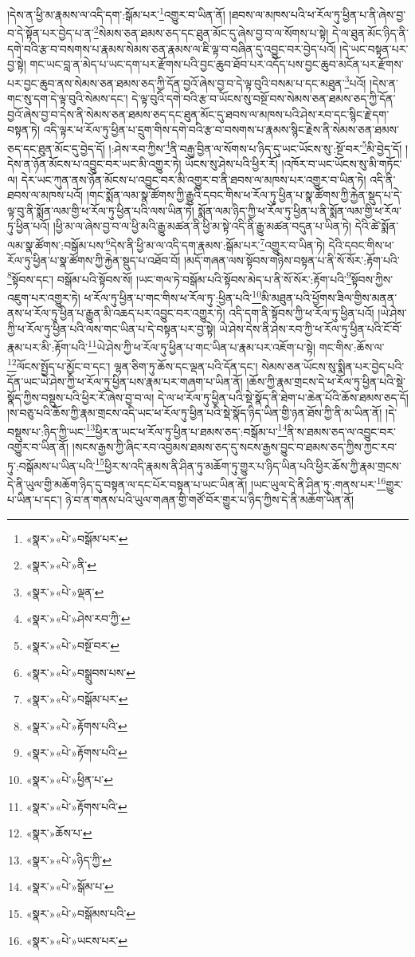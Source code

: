 །དེས་ན་ཕྱི་མ་རྣམས་ལ་འདི་དག་:སྒོམ་པར་\footnote{«སྣར་»«པེ་»བསྒོམ་པར་}འགྱུར་བ་ཡིན་ནོ། །ཐབས་ལ་མཁས་པའི་ཕ་རོལ་ཏུ་ཕྱིན་པ་ནི་ཞེས་བྱ་བ་དེ་སྟོན་པར་བྱེད་པ་ན་\footnote{«སྣར་»«པེ་»ནི་}སེམས་ཅན་ཐམས་ཅད་དང་ཐུན་མོང་དུ་ཞེས་བྱ་བ་ལ་སོགས་པ་སྟེ། དེ་ལ་ཐུན་མོང་ཉིད་ནི་དགེ་བའི་རྩ་བ་བསགས་པ་རྣམས་སེམས་ཅན་རྣམས་ལ་ཇི་ལྟ་བ་བཞིན་དུ་འབྱུང་བར་བྱེད་པའོ། །དེ་ཡང་བསྟན་པར་བྱ་སྟེ། གང་ཡང་བླ་ན་མེད་པ་ཡང་དག་པར་རྫོགས་པའི་བྱང་ཆུབ་ཐོབ་པར་འདོད་པས་བྱང་ཆུབ་མངོན་པར་རྫོགས་པར་བྱང་ཆུབ་ནས་སེམས་ཅན་ཐམས་ཅད་ཀྱི་དོན་བྱའོ་ཞེས་བྱ་བ་དེ་ལྟ་བུའི་བསམ་པ་དང་མཐུན་\footnote{«སྣར་»«པེ་»ལྡན་}པའོ། །དེས་ན་གང་སུ་དག་དེ་ལྟ་བུའི་སེམས་དང་། དེ་ལྟ་བུའི་དགེ་བའི་རྩ་བ་ཡོངས་སུ་བསྔོ་བས་སེམས་ཅན་ཐམས་ཅད་ཀྱི་དོན་བྱའོ་ཞེས་བྱ་བ་དེས་ནི་སེམས་ཅན་ཐམས་ཅད་དང་ཐུན་མོང་དུ་ཐབས་ལ་མཁས་པའི་ཤེས་རབ་དང་སྙིང་རྗེ་དག་བསྟན་ཏེ། འདི་ལྟར་ཕ་རོལ་ཏུ་ཕྱིན་པ་དྲུག་གིས་དགེ་བའི་རྩ་བ་བསགས་པ་རྣམས་སྙིང་རྗེས་ནི་སེམས་ཅན་ཐམས་ཅད་དང་ཐུན་མོང་དུ་བྱེད་དོ། །:ཤེས་རབ་ཀྱིས་\footnote{«སྣར་»«པེ་»ཤེས་རབ་ཀྱི་}ནི་བརྒྱ་བྱིན་ལ་སོགས་པ་ཉིད་དུ་ཡང་ཡོངས་སུ་:སྔོ་བར་\footnote{«སྣར་»«པེ་»བསྔོ་བར་}མི་བྱེད་དོ། །དེས་ན་ཉོན་མོངས་པ་འབྱུང་བར་ཡང་མི་འགྱུར་ཏེ། ཡོངས་སུ་ཤེས་པའི་ཕྱིར་རོ། །འཁོར་བ་ཡང་ཡོངས་སུ་མི་གཏོང་ལ། དེར་ཡང་ཀུན་ནས་ཉོན་མོངས་པ་འབྱུང་བར་མི་འགྱུར་བ་ནི་ཐབས་ལ་མཁས་པར་འགྱུར་བ་ཡིན་ཏེ། འདི་ནི་ཐབས་ལ་མཁས་པའོ། །གང་སྨོན་ལམ་སྣ་ཚོགས་ཀྱི་རྒྱུའི་དབང་གིས་ཕ་རོལ་ཏུ་ཕྱིན་པ་སྣ་ཚོགས་ཀྱི་རྐྱེན་སྡུད་པ་དེ་ལྟ་བུ་ནི་སྨོན་ལམ་གྱི་ཕ་རོལ་ཏུ་ཕྱིན་པའི་ལས་ཡིན་ཏེ། སྨོན་ལམ་ཉིད་ཀྱི་ཕ་རོལ་ཏུ་ཕྱིན་པ་ནི་སྨོན་ལམ་གྱི་ཕ་རོལ་ཏུ་ཕྱིན་པའོ། །ཕྱི་མ་ལ་ཞེས་བྱ་བ་ལ་ཕྱི་མའི་རྒྱུ་མཚན་ནི་ཕྱི་མ་སྟེ་འདི་ནི་རྒྱུ་མཚན་བདུན་པ་ཡིན་ཏེ། དེའི་ཚེ་སྨོན་ལམ་སྣ་ཚོགས་:བསྒོམ་པས་\footnote{«སྣར་»«པེ་»བསྒྲུབས་པས་}དེས་ནི་ཕྱི་མ་ལ་འདི་དག་རྣམས་:སྒོམ་པར་\footnote{«སྣར་»«པེ་»བསྒོམ་པར་}འགྱུར་བ་ཡིན་ཏེ། དེའི་དབང་གིས་ཕ་རོལ་ཏུ་ཕྱིན་པ་སྣ་ཚོགས་ཀྱི་རྐྱེན་སྡུད་པ་འཐོབ་བོ། །མདོ་གཞན་ལས་སྟོབས་གཉིས་བསྟན་པ་ནི་སོ་སོར་:རྟོག་པའི་\footnote{«སྣར་»«པེ་»རྟོགས་པའི་}སྟོབས་དང་། བསྒོམ་པའི་སྟོབས་སོ། །ཡང་གལ་ཏེ་བསྒོམ་པའི་སྟོབས་མེད་པ་ནི་སོ་སོར་:རྟོག་པའི་\footnote{«སྣར་»«པེ་»རྟོགས་པའི་}སྟོབས་ཀྱིས་འཇུག་པར་འགྱུར་ཏེ། ཕ་རོལ་ཏུ་ཕྱིན་པ་གང་གིས་ཕ་རོལ་ཏུ་:ཕྱིན་པའི་\footnote{«སྣར་»«པེ་»ཕྱིན་པ་}མི་མཐུན་པའི་ཕྱོགས་ཟིལ་གྱིས་མནན་ནས་ཕ་རོལ་ཏུ་ཕྱིན་པ་རྒྱུན་མི་འཆད་པར་འབྱུང་བར་འགྱུར་ཏེ། འདི་དག་ནི་སྟོབས་ཀྱི་ཕ་རོལ་ཏུ་ཕྱིན་པའོ། །ཡེ་ཤེས་ཀྱི་ཕ་རོལ་ཏུ་ཕྱིན་པའི་ལས་གང་ཡིན་པ་དེ་བསྟན་པར་བྱ་སྟེ། ཡེ་ཤེས་དེས་ནི་ཤེས་རབ་ཀྱི་ཕ་རོལ་ཏུ་ཕྱིན་པའི་ངོ་བོ་རྣམ་པར་མི་:རྟོག་པའི་\footnote{«སྣར་»«པེ་»རྟོགས་པའི་}ཡེ་ཤེས་ཀྱི་ཕ་རོལ་ཏུ་ཕྱིན་པ་གང་ཡིན་པ་རྣམ་པར་འཇོག་པ་སྟེ། གང་གིས་:ཆོས་ལ་\footnote{«སྣར་»ཆོས་པ་}ལོངས་སྤྱོད་པ་མྱོང་བ་དང་། ལྷན་ཅིག་ཏུ་ཆོས་དང་ལྡན་པའི་དོན་དང་། སེམས་ཅན་ཡོངས་སུ་སྨིན་པར་བྱེད་པའི་དོན་ཡང་ཡེ་ཤེས་ཀྱི་ཕ་རོལ་ཏུ་ཕྱིན་པས་རྣམ་པར་གཞག་པ་ཡིན་ནོ། །ཆོས་ཀྱི་རྣམ་གྲངས་དེ་ཕ་རོལ་ཏུ་ཕྱིན་པའི་སྡེ་སྣོད་ཀྱིས་བསྡུས་པའི་ཕྱིར་རོ་ཞེས་བྱ་བ་ལ། དེ་ལ་ཕ་རོལ་ཏུ་ཕྱིན་པའི་སྡེ་སྣོད་ནི་ཐེག་པ་ཆེན་པོའི་ཆོས་ཐམས་ཅད་དོ། །ས་བཅུ་པའི་ཆོས་ཀྱི་རྣམ་གྲངས་འདི་ཡང་ཕ་རོལ་ཏུ་ཕྱིན་པའི་སྡེ་སྣོད་ཉིད་ཡིན་གྱི་ཉན་ཐོས་ཀྱི་ནི་མ་ཡིན་ནོ། །དེ་བསྡུས་པ་:ཉིད་ཀྱི་ཡང་\footnote{«སྣར་»«པེ་»ཉིད་ཀྱི་}ཕྱིར་ན་ཡང་ཕ་རོལ་ཏུ་ཕྱིན་པ་ཐམས་ཅད་:བསྒོམ་པ་\footnote{«སྣར་»«པེ་»སྒོམ་པ་}ནི་ས་ཐམས་ཅད་ལ་འབྱུང་བར་འགྱུར་བ་ཡིན་ནོ། །སངས་རྒྱས་ཀྱི་ཞིང་རབ་འབྱམས་ཐམས་ཅད་དུ་སངས་རྒྱས་བྱུང་བ་ཐམས་ཅད་ཀྱིས་ཀྱང་རབ་ཏུ་:བསྒོམས་པ་ཡིན་པའི་\footnote{«སྣར་»«པེ་»བསྒོམས་པའི་}ཕྱིར་ས་འདི་རྣམས་ནི་ཤིན་ཏུ་མཆོག་ཏུ་གྱུར་པ་ཉིད་ཡིན་པའི་ཕྱིར་ཆོས་ཀྱི་རྣམ་གྲངས་དེ་ནི་ཡུལ་གྱི་མཆོག་ཉིད་དུ་བསྟན་ལ་དང་པོར་བསྟན་པ་ཡང་ཡིན་ནོ། །ཡང་ཡུལ་དེ་ནི་ཤིན་ཏུ་:གནས་པར་\footnote{«སྣར་»«པེ་»ཡངས་པར་}གྱུར་པ་ཡིན་པ་དང་། ཉེ་བ་ན་གནས་པའི་ཡུལ་གཞན་གྱི་གཙོ་བོར་གྱུར་པ་ཉིད་ཀྱིས་དེ་ནི་མཆོག་ཡིན་ནོ། 